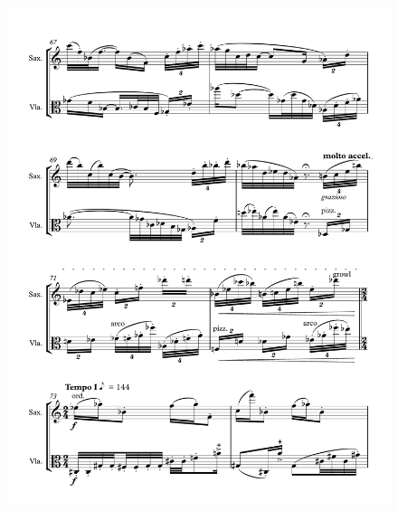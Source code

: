 \begin{figure}[htbp]
    \centering
	\includegraphics[width=6.5in]{figures/Sax_Viola_27.pdf}
\end{figure}

